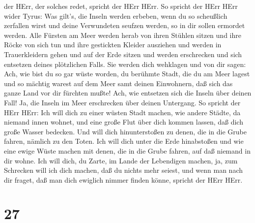 der HErr, der solches redet, spricht der HErr HErr.  So
spricht der HErr HErr wider Tyrus: Was gilt's, die Inseln werden
erbeben, wenn du so scheußlich zerfallen wirst und deine Verwundeten
seufzen werden, so in dir sollen ermordet werden.  Alle
Fürsten am Meer werden herab von ihren Stühlen sitzen und ihre Röcke von
sich tun und ihre gestickten Kleider ausziehen und werden in
Trauerkleidern gehen und auf der Erde sitzen und werden erschrecken und
sich entsetzen deines plötzlichen Falls.  Sie werden dich
wehklagen und von dir sagen: Ach, wie bist du so gar wüste worden, du
berühmte Stadt, die du am Meer lagest und so mächtig warest auf dem Meer
samt deinen Einwohnern, daß sich das ganze Land vor dir fürchten mußte!
 Ach, wie entsetzen sich die Inseln über deinen Fall! Ja,
die Inseln im Meer erschrecken über deinen Untergang.  So
spricht der HErr HErr: Ich will dich zu einer wüsten Stadt machen, wie
andere Städte, da niemand innen wohnet, und eine große Flut über dich
kommen lassen, daß dich große Wasser bedecken.  Und will
dich hinunterstoßen zu denen, die in die Grube fahren, nämlich zu den
Toten. Ich will dich unter die Erde hinabstoßen und wie eine ewige Wüste
machen mit denen, die in die Grube fahren, auf daß niemand in dir wohne.
Ich will dich, du Zarte, im Lande der Lebendigen machen, 
ja, zum Schrecken will ich dich machen, daß du nichts mehr seiest, und
wenn man nach dir fraget, daß man dich ewiglich nimmer finden könne,
spricht der HErr HErr.

\hypertarget{section-26}{%
\section{27}\label{section-26}}

